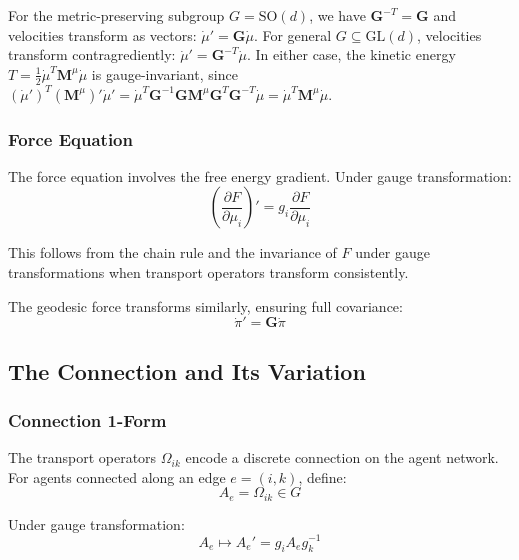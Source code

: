 \documentclass[12pt]{article}
\begin{document}
For the metric-preserving subgroup $G = \mathrm{SO}(d)$, we have $\mathbf{G}^{-T} = \mathbf{G}$ and velocities transform as vectors: $\dot{\mu}' = \mathbf{G}\dot{\mu}$. For general $G \subseteq \mathrm{GL}(d)$, velocities transform contragrediently: $\dot{\mu}' = \mathbf{G}^{-T}\dot{\mu}$. In either case, the kinetic energy $T = \frac{1}{2}\dot{\mu}^T\mathbf{M}^\mu\dot{\mu}$ is gauge-invariant, since $(\dot{\mu}')^T(\mathbf{M}^\mu)'\dot{\mu}' = \dot{\mu}^T\mathbf{G}^{-1}\mathbf{G}\mathbf{M}^\mu\mathbf{G}^T\mathbf{G}^{-T}\dot{\mu} = \dot{\mu}^T\mathbf{M}^\mu\dot{\mu}$.

\subsubsection{Force Equation}

The force equation involves the free energy gradient. Under gauge transformation:
\begin{equation}
\left(\frac{\partial F}{\partial\mu_i}\right)' = g_i \frac{\partial F}{\partial\mu_i}
\end{equation}

This follows from the chain rule and the invariance of $F$ under gauge transformations when transport operators transform consistently.

The geodesic force transforms similarly, ensuring full covariance:
\begin{equation}
\boxed{\dot{\pi}' = \mathbf{G}\dot{\pi}}
\end{equation}

\subsection{The Connection and Its Variation}

\subsubsection{Connection 1-Form}

The transport operators $\Omega_{ik}$ encode a discrete connection on the agent network. For agents connected along an edge $e = (i,k)$, define:
\begin{equation}
A_e = \Omega_{ik} \in G
\end{equation}

Under gauge transformation:
\begin{equation}
A_e \mapsto A_e' = g_i A_e g_k^{-1}
\end{equation}
\end{document}
